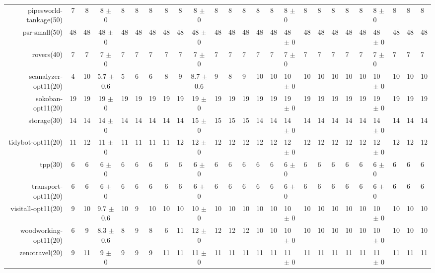 \begin{center}
\begin{tabular}{|r|cccHHH|cccHHHHHHHHHHHHHHH|}
pipesworld-tankage(50) & 7 & 8 & 8 $\pm$ 0 & 8 & 8 & 8 & 8 & 8 & 8 $\pm$ 0 & 8 & 8 & 8 & 8 & 8 & 8 $\pm$ 0 & 8 & 8 & 8 & 8 & 8 & 8 $\pm$ 0 & 8 & 8 & 8\\
psr-small(50) & 48 & 48 & 48 $\pm$ 0 & 48 & 48 & 48 & 48 & 48 & 48 $\pm$ 0 & 48 & 48 & 48 & 48 & 48 & 48 $\pm$ 0 & 48 & 48 & 48 & 48 & 48 & 48 $\pm$ 0 & 48 & 48 & 48\\
rovers(40) & 7 & 7 & 7 $\pm$ 0 & 7 & 7 & 7 & 7 & 7 & 7 $\pm$ 0 & 7 & 7 & 7 & 7 & 7 & 7 $\pm$ 0 & 7 & 7 & 7 & 7 & 7 & 7 $\pm$ 0 & 7 & 7 & 7\\
scanalyzer-opt11(20) & 4 & 10 & 5.7 $\pm$ 0.6 & 5 & 6 & 6 & 8 & 9 & 8.7 $\pm$ 0.6 & 9 & 8 & 9 & 10 & 10 & 10 $\pm$ 0 & 10 & 10 & 10 & 10 & 10 & 10 $\pm$ 0 & 10 & 10 & 10\\
sokoban-opt11(20) & 19 & 19 & 19 $\pm$ 0 & 19 & 19 & 19 & 19 & 19 & 19 $\pm$ 0 & 19 & 19 & 19 & 19 & 19 & 19 $\pm$ 0 & 19 & 19 & 19 & 19 & 19 & 19 $\pm$ 0 & 19 & 19 & 19\\
storage(30) & 14 & 14 & 14 $\pm$ 0 & 14 & 14 & 14 & 14 & 14 & 15 $\pm$ 0 & 15 & 15 & 15 & 14 & 14 & 14 $\pm$ 0 & 14 & 14 & 14 & 14 & 14 & 14 $\pm$ 0 & 14 & 14 & 14\\
tidybot-opt11(20) & 11 & 12 & 11 $\pm$ 0 & 11 & 11 & 11 & 11 & 12 & 12 $\pm$ 0 & 12 & 12 & 12 & 12 & 12 & 12 $\pm$ 0 & 12 & 12 & 12 & 12 & 12 & 12 $\pm$ 0 & 12 & 12 & 12\\
tpp(30) & 6 & 6 & 6 $\pm$ 0 & 6 & 6 & 6 & 6 & 6 & 6 $\pm$ 0 & 6 & 6 & 6 & 6 & 6 & 6 $\pm$ 0 & 6 & 6 & 6 & 6 & 6 & 6 $\pm$ 0 & 6 & 6 & 6\\
transport-opt11(20) & 6 & 6 & 6 $\pm$ 0 & 6 & 6 & 6 & 6 & 6 & 6 $\pm$ 0 & 6 & 6 & 6 & 6 & 6 & 6 $\pm$ 0 & 6 & 6 & 6 & 6 & 6 & 6 $\pm$ 0 & 6 & 6 & 6\\
visitall-opt11(20) & 9 & 10 & 9.7 $\pm$ 0.6 & 10 & 9 & 10 & 10 & 10 & 10 $\pm$ 0 & 10 & 10 & 10 & 10 & 10 & 10 $\pm$ 0 & 10 & 10 & 10 & 10 & 10 & 10 $\pm$ 0 & 10 & 10 & 10\\
woodworking-opt11(20) & 6 & 9 & 8.3 $\pm$ 0.6 & 8 & 9 & 8 & 6 & 11 & 12 $\pm$ 0 & 12 & 12 & 12 & 10 & 10 & 10 $\pm$ 0 & 10 & 10 & 10 & 10 & 10 & 10 $\pm$ 0 & 10 & 10 & 10\\
zenotravel(20) & 9 & 11 & 9 $\pm$ 0 & 9 & 9 & 9 & 11 & 11 & 11 $\pm$ 0 & 11 & 11 & 11 & 11 & 11 & 11 $\pm$ 0 & 11 & 11 & 11 & 11 & 11 & 11 $\pm$ 0 & 11 & 11 & 11\\
\hline
\end{tabular}
\end{center}
